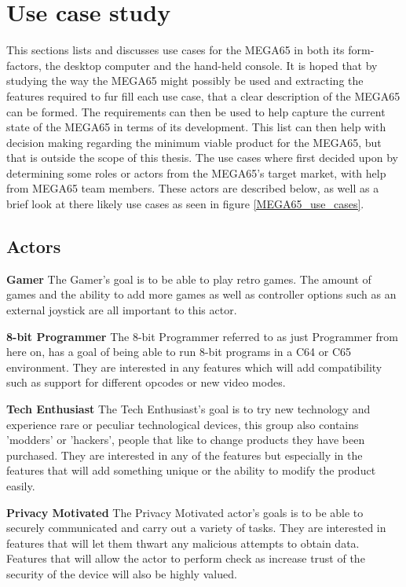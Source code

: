 \section{Use case study}
This sections lists and discusses use cases for the MEGA65 in both its form-factors, the desktop computer and the hand-held console. It is hoped that by studying the way the MEGA65 might possibly be used and extracting the features required to fur fill each use case, that a clear description of the MEGA65 can be formed. The requirements can then be used to help capture the current state of the MEGA65 in terms of its development. This list can then help with decision making regarding the minimum viable product for the MEGA65, but that is outside the scope of this thesis. The use cases where first decided upon by determining some roles or actors from the MEGA65's target market, with help from MEGA65 team members. These actors are described below, as well as a brief look at there likely use cases as seen in figure \ref{MEGA65_use_cases}.

\subsection{Actors}
\textbf{Gamer}
The Gamer's goal is to be able to play retro games. The amount of games and the ability to add more games as well as controller options such as an external joystick are all important to this actor.

\textbf{8-bit Programmer}
The 8-bit Programmer referred to as just Programmer from here on, has a goal of being able to run 8-bit programs in a C64 or C65 environment. They are interested in any features which will add compatibility such as support for different opcodes or new video modes. 

\textbf{Tech Enthusiast}
The Tech Enthusiast's goal is to try new technology and experience rare or peculiar technological devices, this group also contains 'modders' or 'hackers', people that like to change products they have been purchased. They are interested in any of the features but especially in the features that will add something unique or the ability to modify the product easily.

\textbf{Privacy Motivated}
The Privacy Motivated actor's goals is to be able to securely communicated and carry out a variety of tasks. They are interested in features that will let them thwart any malicious attempts to obtain data. Features that will allow the actor to perform check as increase trust of the security of the device will also be highly valued. 

